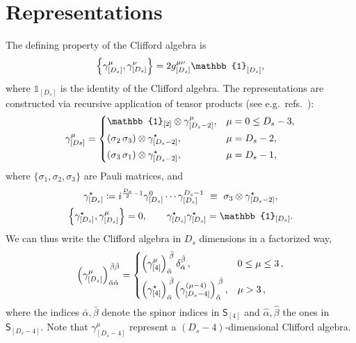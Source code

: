 \section{Representations}
The defining property of the Clifford algebra is
\begin{equation} \label{eqn:defClifford}
\acomm{\gamma_{[D_s]}^\mu}{\gamma_{[D_s]}^\nu} = 2 g_{[D_s]}^{\mu\nu}\mathbb{1}_{[D_s]}^{\vphantom{\mu\nu}},
\end{equation}
where $\mathbb{1}_{[D_s]}$ is the identity of the Clifford algebra.
The representations are constructed via recursive application of tensor products (see e.g.\ refs.~\cite{Collins:1984xc,Kreuzer:susylectures}):
\begin{align}\label{eq:gammait}
  \gamma^\mu_{[Ds]}  = 
  \begin{dcases}
    \mathbb{1}_{[2]} \otimes \gamma^\mu_{[D_s-2]}, & \mu =0\leq D_s-3,\\
    (\sigma_2\,\sigma_3) \otimes \gamma^\star_{[D_s-2]}, & \mu = D_s-2,\\
    (\sigma_3\,\sigma_1) \otimes \gamma^\star_{[D_s-2]}, & \mu = D_s-1,\\
  \end{dcases}
\end{align}
where $\{\sigma_1,\sigma_2,\sigma_3\}$ are Pauli matrices, and
\begin{equation}
  \begin{gathered}
    \gamma^\star_{[D_s]} \coloneqq i^{\frac{D_s}{2}-1} \gamma^0_{[D_s]}\cdots{}\gamma^{D_s -1 }_{[D_s]} ~\equiv~ \sigma_3 \otimes \gamma^\star_{[D_s-2]}, \\
    \acomm{\gamma^\star_{[D_s]}}{\gamma^\mu_{[D_s]}}=0, \qquad \gamma^\star_{[D_s]} \gamma^\star_{[D_s]} = \mathbb{1}_{[D_s]}.
  \end{gathered}
\end{equation}
We can thus write the Clifford algebra in $D_s$ dimensions in a factorized way,
\begin{equation}\label{eqn:cliffordrecursion}
  \qty(\gamma_{[D_s]}^\mu)_{\bar{\alpha}\hat{\alpha}}^{\,\bar{\beta}\hat{\beta}}  =
  \begin{dcases}
    \qty(\gamma_{[4]}^\mu)_{\bar{\alpha}}^{\;\bar{\beta}} \, \delta_{\hat{\alpha}}^{\hat{\beta}}\,, &  0\le\mu \le 3 \,,\\
    \qty(\gamma^{\star}_{[4]})_{\bar{\alpha}}^{\;\bar{\beta}} \qty(\gamma_{[D_s-4]}^{(\mu-4)})_{\hat{\alpha}}^{\;\hat{\beta}}\,, & \mu>3 \,,
  \end{dcases}
\end{equation}
where the indices $\bar{\alpha},\bar{\beta}$ denote the spinor indices in $\mathsf{S}_{[4]}$ and $\hat{\alpha},\hat{\beta}$ the ones in $\mathsf{S}_{[D_s - 4]}$.
Note that $\gamma^\mu_{[D_s-4]}$ represent a $(D_s-4)$-dimensional Clifford algebra.

